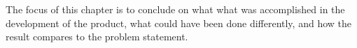 The focus of this chapter is to conclude on what what was accomplished in the development of the product, what could have been done differently, and how the result compares to the problem statement.